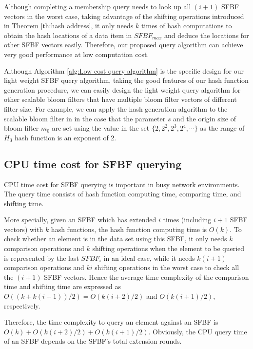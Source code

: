 \documentclass[10pt,journal,compsoc]{IEEEtran}
\newcommand{\rev}[1]{#1}
\newcommand{\note}[1]{{\sffamily\itshape\bfseries\uline{#1}}}
\begin{document}


Although completing a membership query needs to look up all $(i+1)$ SFBF vectors in the worst case, taking advantage of the shifting operations introduced in Theorem \ref{th:hash address}, it only needs $k$ times of hash computations to obtain the hash locations of a data item in $SFBF_{max}$ and deduce the locations for other SFBF vectors easily. Therefore, our proposed query algorithm can achieve very good performance at low computation cost.

\rev{Although Algorithm \ref{alg:Low cost query algorithm} is the specific design for our light weight SFBF query algorithm, taking the good features of our hash function generation procedure, we can easily design the light weight query algorithm for other scalable bloom filters that have multiple bloom filter vectors of different filter size. For example, we can apply the hash generation algorithm to the scalable bloom filter in \cite{almeida2007scalable} in the case that the parameter $s$ and the origin size of bloom filter $m_0$ are set using the value in the set $\{2,2^2,2^3,2^4, \cdots\}$ as the range of $H_3$ hash function is an exponent of 2}.


\subsection{CPU time cost for SFBF querying}
CPU time cost for SFBF querying is important in busy network environments.
The query time consists of hash function computing time, comparing time, and shifting time.

More specially, given an SFBF which has extended $i$ times (including $i+1$ SFBF vectors) with $k$ hash functions, the hash function computing time is $O(k)$. To check whether an element is in the data set using this SFBF, it only needs $k$ comparison operations and $k$ shifting operations when the element to be queried is represented by the last $SFBF_i$ in an \rev{ideal} case, while it needs $k(i+1)$ comparison operations and $ki$ shifting operations in the worst case to check all the $(i+1)$ SFBF vectors. Hence the average time complexity of the comparison time and shifting time are expressed as
$O((k+k(i+1))/2)=O(k(i+2)/2)$ and $O(k(i+1)/2)$, respectively.


Therefore, the time complexity to query an element against an SFBF is $O(k)+O(k(i+2)/2)+O(k(i+1)/2)$.
Obviously, the CPU query time of an SFBF depends on the SFBF's total extension rounds.
\end{document}
